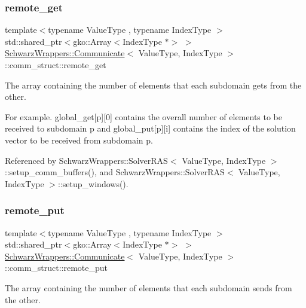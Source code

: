 \subsubsection{\texorpdfstring{remote\+\_\+get}{remote\_get}}
{\footnotesize\ttfamily template$<$typename Value\+Type , typename Index\+Type $>$ \\
std\+::shared\+\_\+ptr$<$gko\+::\+Array$<$Index\+Type $\ast$$>$ $>$ \hyperlink{classSchwarzWrappers_1_1Communicate}{Schwarz\+Wrappers\+::\+Communicate}$<$ Value\+Type, Index\+Type $>$\+::comm\+\_\+struct\+::remote\+\_\+get}



The array containing the number of elements that each subdomain gets from the other. 

For example. global\+\_\+get\mbox{[}p\mbox{]}\mbox{[}0\mbox{]} contains the overall number of elements to be received to subdomain p and global\+\_\+put\mbox{[}p\mbox{]}\mbox{[}i\mbox{]} contains the index of the solution vector to be received from subdomain p. 

Referenced by Schwarz\+Wrappers\+::\+Solver\+R\+A\+S$<$ Value\+Type, Index\+Type $>$\+::setup\+\_\+comm\+\_\+buffers(), and Schwarz\+Wrappers\+::\+Solver\+R\+A\+S$<$ Value\+Type, Index\+Type $>$\+::setup\+\_\+windows().

\mbox{\label{structSchwarzWrappers_1_1Communicate_1_1comm__struct_a6059941b0959c17b4264ba0cc7690c4d}} 
\subsubsection{\texorpdfstring{remote\+\_\+put}{remote\_put}}
{\footnotesize\ttfamily template$<$typename Value\+Type , typename Index\+Type $>$ \\
std\+::shared\+\_\+ptr$<$gko\+::\+Array$<$Index\+Type $\ast$$>$ $>$ \hyperlink{classSchwarzWrappers_1_1Communicate}{Schwarz\+Wrappers\+::\+Communicate}$<$ Value\+Type, Index\+Type $>$\+::comm\+\_\+struct\+::remote\+\_\+put}



The array containing the number of elements that each subdomain sends from the other. 

